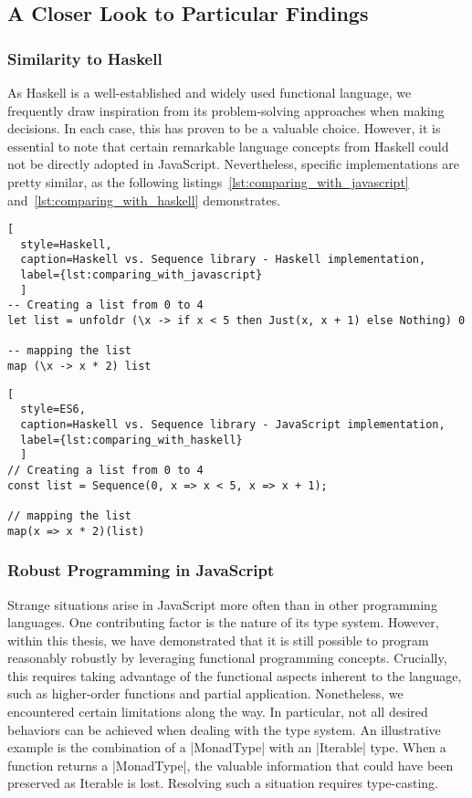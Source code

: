 \subsection{A Closer Look to Particular Findings}
\label{sub:A Closer Look to Particular Findings}

\subsubsection{Similarity to Haskell}
\label{subsub:Similarity to Haskell}
As Haskell is a well-established and widely used functional language, we
frequently draw inspiration from its problem-solving approaches when making
decisions. In each case, this has proven to be a valuable choice. However, it
is essential to note that certain remarkable language concepts from Haskell
could not be directly adopted in JavaScript. Nevertheless, specific
implementations are pretty similar, as the following listings~\ref{lst:comparing_with_javascript} 
and~\ref{lst:comparing_with_haskell} demonstrates.

\begin{lstlisting}[
  style=Haskell, 
  caption=Haskell vs. Sequence library - Haskell implementation, 
  label={lst:comparing_with_javascript}
  ]
-- Creating a list from 0 to 4
let list = unfoldr (\x -> if x < 5 then Just(x, x + 1) else Nothing) 0

-- mapping the list
map (\x -> x * 2) list 
\end{lstlisting}

\begin{lstlisting}[
  style=ES6, 
  caption=Haskell vs. Sequence library - JavaScript implementation,
  label={lst:comparing_with_haskell}
  ]
// Creating a list from 0 to 4
const list = Sequence(0, x => x < 5, x => x + 1);

// mapping the list
map(x => x * 2)(list)
\end{lstlisting}


\subsubsection{Robust Programming in JavaScript}
\label{subsub:Robust Programming in JavaScript}
Strange situations arise in JavaScript more often than in other programming
languages. One contributing factor is the nature of its type system. However,
within this thesis, we have demonstrated that it is still possible to program
reasonably robustly by leveraging functional programming concepts. Crucially,
this requires taking advantage of the functional aspects inherent to the
language, such as higher-order functions and partial application. Nonetheless,
we encountered certain limitations along the way. In particular, not all
desired behaviors can be achieved when dealing with the type system.
An illustrative example is the combination of a |MonadType| with an |Iterable|
type. When a function returns a  |MonadType|, the valuable information that could
have been preserved as Iterable is lost. Resolving such a situation requires
type-casting.

